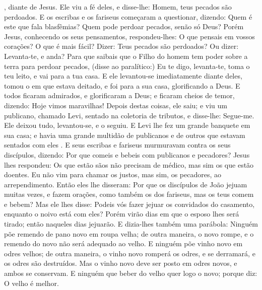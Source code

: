 {{},  diante de Jesus.
  Ele viu a fé deles, e disse-lhe: Homem, teus pecados são perdoados.
  E os escribas e os fariseus começaram a questionar, dizendo: Quem é este que fala blasfêmias? Quem pode perdoar pecados, senão só Deus?
  Porém Jesus, conhecendo os seus pensamentos, respondeu-lhes: O que pensais em vossos corações?
  O que é mais fácil? Dizer: Teus pecados são perdoados? Ou dizer: Levanta-te, e anda?
  Para que saibais que o Filho do homem tem poder sobre a terra para perdoar pecados, (disse ao paralítico:) Eu te digo, levanta-te, toma o teu leito, e vai para a tua casa.
  E ele levantou-se imediatamente diante deles, tomou o
{} em que estava deitado, e foi para a sua casa, glorificando a Deus.
  E todos ficaram admirados, e glorificaram a Deus; e ficaram cheios de temor, dizendo: Hoje vimos maravilhas!
  Depois destas coisas, ele saiu; e viu um publicano, chamado Levi, sentado na coletoria de tributos, e disse-lhe: Segue-me.
  Ele deixou tudo, levantou-se, e o seguiu.
  E Levi lhe fez um grande banquete em sua casa; e havia
{} uma grande multidão de publicanos e de outros que estavam sentados com eles
{} .
  E seus escribas e fariseus murmuravam contra os seus discípulos, dizendo: Por que comeis e bebeis com publicanos e pecadores?
  Jesus lhes respondeu: Os que estão sãos não precisam de médico, mas sim os que estão doentes.
  Eu não vim para chamar os justos, mas sim, os pecadores, ao arrependimento.
  Então eles lhe disseram: Por que os discípulos de João jejuam muitas vezes, e fazem orações, como também os dos fariseus, mas os teus comem e bebem?
  Mas ele lhes disse: Podeis vós fazer jejuar os convidados do casamento,
 enquanto o noivo está com eles?
  Porém virão dias em que o esposo lhes será tirado; então naqueles dias jejuarão.
  E dizia-lhes também uma parábola: Ninguém põe remendo de pano novo em roupa velha; de outra maneira, o novo rompe, e o remendo do novo não será adequado ao velho.
  E ninguém põe vinho novo em odres velhos; de outra maneira, o vinho novo romperá os odres, e se derramará, e os odres são destruídos.
  Mas o vinho novo deve ser posto em odres novos, e ambos se conservam.
  E ninguém que beber do velho quer logo o novo; porque diz: O velho é melhor.
\par }

